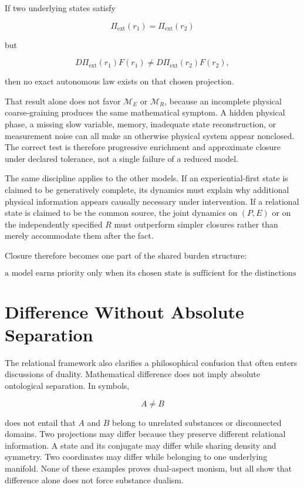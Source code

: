 If two underlying states satisfy

\[
\Pi_{\mathrm{ext}}(r_1)=\Pi_{\mathrm{ext}}(r_2)
\]

but

\[
D\Pi_{\mathrm{ext}}(r_1)F(r_1)
\neq
D\Pi_{\mathrm{ext}}(r_2)F(r_2),
\]

then no exact autonomous law exists on that chosen projection.

That result alone does not favor $\mathcal M_E$ or $\mathcal M_R$, because an incomplete physical coarse-graining produces the same mathematical symptom. A hidden physical phase, a missing slow variable, memory, inadequate state reconstruction, or measurement noise can all make an otherwise physical system appear nonclosed. The correct test is therefore progressive enrichment and approximate closure under declared tolerance, not a single failure of a reduced model.

The same discipline applies to the other models. If an experiential-first state is claimed to be generatively complete, its dynamics must explain why additional physical information appears causally necessary under intervention. If a relational state is claimed to be the common source, the joint dynamics on $(P,E)$ or on the independently specified $R$ must outperform simpler closures rather than merely accommodate them after the fact.

Closure therefore becomes one part of the shared burden structure:

\[
\boxed{
\text{a model earns priority only when its chosen state is sufficient for the distinctions and transitions it claims to generate.}
}
\]

\section{Difference Without Absolute Separation}

The relational framework also clarifies a philosophical confusion that often enters discussions of duality. Mathematical difference does not imply absolute ontological separation. In symbols,

\[
A\neq B
\]

does not entail that $A$ and $B$ belong to unrelated substances or disconnected domains. Two projections may differ because they preserve different relational information. A state and its conjugate may differ while sharing density and symmetry. Two coordinates may differ while belonging to one underlying manifold. None of these examples proves dual-aspect monism, but all show that difference alone does not force substance dualism.

